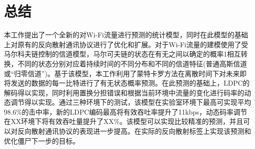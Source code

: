 
\chapter{总结}
\label{chap:conclusion}

本工作提出了一个全新的对Wi-Fi流量进行预测的统计模型，同时在此模型的基础上对原有的反向散射通讯协议进行了优化和扩展。对于Wi-Fi流量的建模使用了受马尔科夫链控制的信道模型，马尔可夫链的状态在有无之间以确定的概率1相互转换，不同的状态分别对应着持续时间的不同分布和不同的信道特征(普通高斯信道或“归零信道”)。基于该模型，本工作利用了蒙特卡罗方法在离散时间下对未来即将发送的数据的每一比特进行了有无状态概率预测。在此预测的基础上，LDPC的解码得以实现，同时利用置换分担错误和根据当前环境中流量的变化进行码率的动态调节得以实现。通过三种环境下的测试，该模型在实验室环境下最高可实现平均98.6\%的击中率，新的LDPC编码最高将有效吞吐率提升了11kbps，动态码率调节在XX环境下将有效吞吐量提升了XX\%。该模型可以实现比较精准的预测，并且可以对反向散射通讯协议的表现进一步提高。在实际的反向散射标签上实现该预测和优化僵尸下一步的目标。